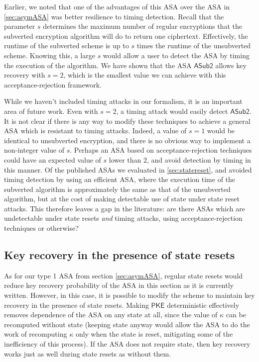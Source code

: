 Earlier, we noted that one of the advantages of this ASA over the ASA in \autoref{sec:asymASA} was better resilience to timing detection. Recall that the parameter $s$ determines the maximum number of regular encryptions that the subverted encryption algorithm will do to return one ciphertext. Effectively, the runtime of the subverted scheme is up to $s$ times the runtime of the unsubverted scheme. Knowing this, a large $s$ would allow a user to detect the ASA by timing the execution of the algorithm. We have shown that the ASA $\mathsf{ASub2}$ allows key recovery with $s=2$, which is the smallest value we can achieve with this acceptance-rejection framework.

While we haven't included timing attacks in our formalism, it is an important area of future work. Even with $s=2$, a timing attack would easily detect $\mathsf{ASub2}$. It is not clear if there is any way to modify these techniques to achieve a general ASA which is resistant to timing attacks. Indeed, a value of $s=1$ would be identical to unsubverted encryption, and there is no obvious way to implement a non-integer value of $s$. Perhaps an ASA based on acceptance-rejection techniques could have an expected value of $s$ lower than 2, and avoid detection by timing in this manner. Of the published ASAs we evaluated in \autoref{sec:statereset}, \cite{BSKC2019} and \cite{AC:CheHuaYun20} avoided timing detection by using an efficient ASA, where the execution time of the subverted algorithm is approximately the same as that of the unsubverted algorithm, but at the cost of making detectable use of state under state reset attacks. This therefore leaves a gap in the literature: are there ASAs which are undetectable under state resets \emph{and} timing attacks, using acceptance-rejection techniques or otherwise?

\subsection{Key recovery in the presence of state resets}
As for our type 1 ASA from section \autoref{sec:asymASA}, regular state resets would reduce key recovery probability of the ASA in this section as it is currently written. However, in this case, it is possible to modify the scheme to maintain key recovery in the presence of state resets. Making $\textsf{PKE}$ deterministic effectively removes dependence of the ASA on any state at all, since the value of $\kappa$ can be recomputed without state (keeping state anyway would allow the ASA to do the work of recomputing $\kappa$ only when the state is reset, mitigating some of the inefficiency of this process). If the ASA does not require state, then key recovery works just as well during state resets as without them.

